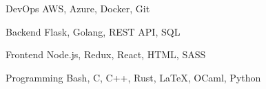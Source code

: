 

\begin{cvskills}

  \cvskill
    {DevOps} %
    {AWS, Azure, Docker, Git} %

  \cvskill
    {Backend} %
    {Flask, Golang, REST API, SQL} %

  \cvskill
    {Frontend} %
    {Node.js, Redux, React, HTML, SASS} %

  \cvskill
    {Programming} %
    {Bash, C, C++, Rust, LaTeX, OCaml, Python} %

\end{cvskills}

